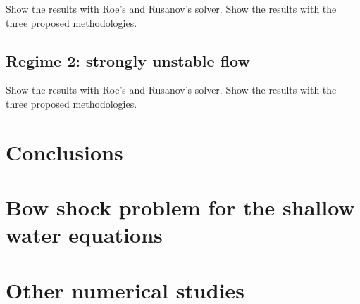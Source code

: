 \documentclass[preprint, 11pt]{article}
\begin{document}
Show the results with Roe's and Rusanov's solver. 
Show the results with the three proposed methodologies. 

\subsection{Regime 2: strongly unstable flow}

Show the results with Roe's and Rusanov's solver. 
Show the results with the three proposed methodologies. 

\clearpage
\section{Conclusions}

\appendix
\section{Bow shock problem for the shallow water equations}

\section{Other numerical studies}



\end{document}

